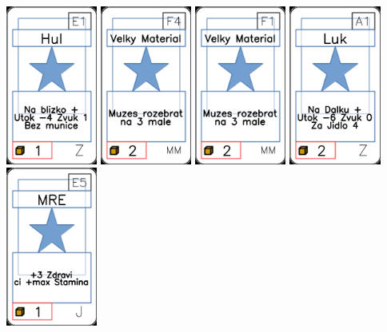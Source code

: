 \documentclass[a4paper]{article}
\begin{document}
	\includegraphics[width=3.0cm]{img-1_80}
	\includegraphics[width=3.0cm]{img-1_58}
	\includegraphics[width=3.0cm]{img-1_55}
	\includegraphics[width=3.0cm]{img-1_90}
	\includegraphics[width=3.0cm]{img-1_24}
\end{document}
